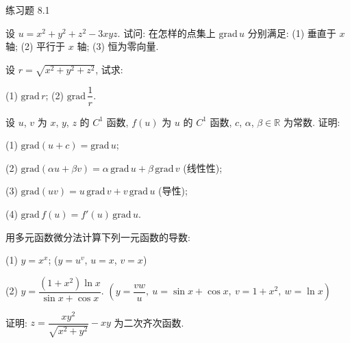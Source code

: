 \begin{exblock}{练习题 8.1}
  \item 设 $u = x^{2} + y^{2} + z^{2} - 3xyz$. 试问: 在怎样的点集上 $\mathrm{grad}\,u$ 分别满足: (1) 垂直于 $x$ 轴; (2) 平行于 $x$ 轴; (3) 恒为零向量.

  \item 设 $r = \sqrt{x^{2} + y^{2} + z^{2}}$, 试求:

  (1) $\mathrm{grad}\,r$; \quad (2) $\mathrm{grad}\,\dfrac{1}{r}$.

  \item 设 $u$, $v$ 为 $x$, $y$, $z$ 的 $C^{1}$ 函数, $f(u)$ 为 $u$ 的 $C^{1}$ 函数, $c$, $\alpha$, $\beta \in \mathbb{R}$ 为常数. 证明:

  (1) $\mathrm{grad}(u + c) = \mathrm{grad}\,u$;

  (2) $\mathrm{grad}(\alpha u + \beta v) = \alpha\,\mathrm{grad}\,u + \beta\,\mathrm{grad}\,v$ (线性性);

  (3) $\mathrm{grad}(uv) = u\,\mathrm{grad}\,v + v\,\mathrm{grad}\,u$ (导性);

  (4) $\mathrm{grad}\,f(u) = f'(u)\,\mathrm{grad}\,u$.

  \item 用多元函数微分法计算下列一元函数的导数:

  (1) $y = x^{x}$; \quad ($y = u^{v}$, $u = x$, $v = x$)

  (2) $y = \dfrac{(1 + x^{2})\ln x}{\sin x + \cos x}$. \quad $\left(y = \dfrac{vw}{u},\ u = \sin x + \cos x,\ v = 1 + x^{2},\ w = \ln x\right)$

  \item 证明: $z = \dfrac{xy^{2}}{\sqrt{x^{2} + y^{2}}} - xy$ 为二次齐次函数.
\end{exblock}

